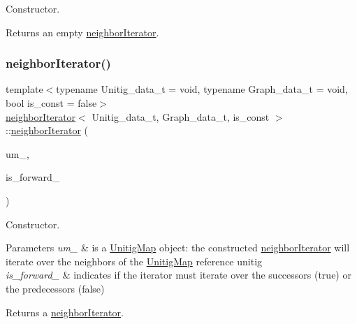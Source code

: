 Constructor. 

\begin{DoxyReturn}{Returns}
an empty \hyperlink{classneighborIterator}{neighbor\+Iterator}. 
\end{DoxyReturn}
\mbox{\label{classneighborIterator_a3a524d5ee6219ea7ccc3a11f69d80835}} 
\subsubsection{\texorpdfstring{neighbor\+Iterator()}{neighborIterator()}\hspace{0.1cm}{\footnotesize\ttfamily [2/3]}}
{\footnotesize\ttfamily template$<$typename Unitig\+\_\+data\+\_\+t = void, typename Graph\+\_\+data\+\_\+t = void, bool is\+\_\+const = false$>$ \\
\hyperlink{classneighborIterator}{neighbor\+Iterator}$<$ Unitig\+\_\+data\+\_\+t, Graph\+\_\+data\+\_\+t, is\+\_\+const $>$\+::\hyperlink{classneighborIterator}{neighbor\+Iterator} (\begin{DoxyParamCaption}\item[{const \hyperlink{classUnitigMap}{Unitig\+Map}$<$ U, G, is\+\_\+const $>$ \&}]{um\+\_\+,  }\item[{const bool}]{is\+\_\+forward\+\_\+ }\end{DoxyParamCaption})}



Constructor. 


\begin{DoxyParams}{Parameters}
{\em um\+\_\+} & is a \hyperlink{classUnitigMap}{Unitig\+Map} object\+: the constructed \hyperlink{classneighborIterator}{neighbor\+Iterator} will iterate over the neighbors of the \hyperlink{classUnitigMap}{Unitig\+Map} reference unitig \\
\hline
{\em is\+\_\+forward\+\_\+} & indicates if the iterator must iterate over the successors (true) or the predecessors (false) \\
\hline
\end{DoxyParams}
\begin{DoxyReturn}{Returns}
a \hyperlink{classneighborIterator}{neighbor\+Iterator}. 
\end{DoxyReturn}
\mbox{\label{classneighborIterator_ad7ee6efe87e4c4619c96e6c4fae809df}} 
